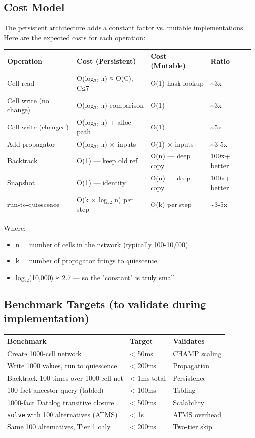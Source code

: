 \documentclass[11pt]{article}
\begin{document}
\subsection{Cost Model}
\label{sec:orga0f2d2e}

The persistent architecture adds a constant factor vs. mutable implementations.
Here are the expected costs for each operation:

\begin{center}
\begin{tabular}{llll}
Operation & Cost (Persistent) & Cost (Mutable) & Ratio\\
\hline
Cell read & O(log₃₂ n) ≈ O(C), C≤7 & O(1) hash lookup & \textasciitilde{}3x\\
Cell write (no change) & O(log₃₂ n) comparison & O(1) & \textasciitilde{}3x\\
Cell write (changed) & O(log₃₂ n) + alloc path & O(1) & \textasciitilde{}5x\\
Add propagator & O(log₃₂ n) × inputs & O(1) × inputs & \textasciitilde{}3-5x\\
Backtrack & O(1) — keep old ref & O(n) — deep copy & 100x+ better\\
Snapshot & O(1) — identity & O(n) — deep copy & 100x+ better\\
run-to-quiescence & O(k × log₃₂ n) per step & O(k) per step & \textasciitilde{}3-5x\\
\end{tabular}
\end{center}

Where:
\begin{itemize}
\item n = number of cells in the network (typically 100-10,000)
\item k = number of propagator firings to quiescence
\item log₃₂(10,000) ≈ 2.7 — so the "constant" is truly small
\end{itemize}
\subsection{Benchmark Targets (to validate during implementation)}
\label{sec:orgeb4d327}

\begin{center}
\begin{tabular}{lll}
Benchmark & Target & Validates\\
\hline
Create 1000-cell network & < 50ms & CHAMP scaling\\
Write 1000 values, run to quiescence & < 200ms & Propagation\\
Backtrack 100 times over 1000-cell net & < 1ms total & Persistence\\
100-fact ancestor query (tabled) & < 100ms & Tabling\\
1000-fact Datalog transitive closure & < 500ms & Scalability\\
\texttt{solve} with 100 alternatives (ATMS) & < 1s & ATMS overhead\\
Same 100 alternatives, Tier 1 only & < 200ms & Two-tier skip\\
\end{tabular}
\end{center}
\end{document}
